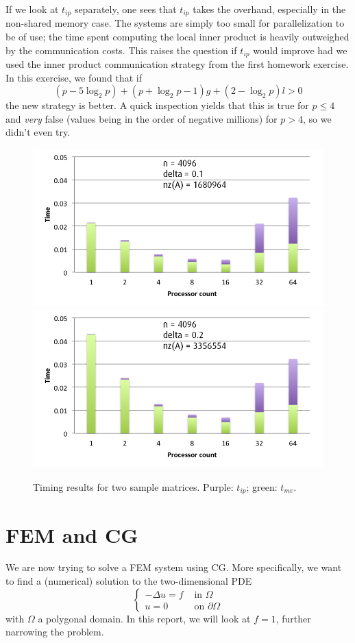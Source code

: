 \documentclass[11pt]{amsart}
\theoremstyle{definition}
\begin{document}
If we look at $t_{ip}$ separately, one sees that $t_{ip}$ takes the overhand, especially in the non-shared memory case. The systems are simply too small for parallelization to be of use; the time spent computing the local inner product is heavily outweighed by the communication costs. This raises the question if $t_{ip}$ would improve had we used the inner product communication strategy from the first homework exercise. \cite{TODOHUISWERK} In this exercise, we found that if
\[
  (p - 5\log_2 p) + (p + \log_2 p - 1)g + (2-\log_2 p)l > 0
\]
the new strategy is better. A quick inspection yields that this is true for $p \leq 4$ and \emph{very} false (values being in the order of negative millions) for $p > 4$, so we didn't even try.

\begin{figure}
  \includegraphics[width=0.48\linewidth]{n4096d0_1mvip.png}
  \includegraphics[width=0.48\linewidth]{n4096d0_2mvip.png}
  \caption{Timing results for two sample matrices. Purple: $t_{ip}$; green: $t_{mv}$.}
  \label{fig:samples}
\end{figure}


\section{FEM and CG}
We are now trying to solve a FEM system using CG. More specifically, we want to find a (numerical) solution to the two-dimensional PDE
\begin{equation}
  \label{eqn:fem}
  \begin{cases} -\Delta u = f & \text{ in } \Omega \\ u = 0 & \text{ on } \partial \Omega \end{cases}
\end{equation}
with $\Omega$ a polygonal domain. In this report, we will look at $f=1$, further narrowing the problem.
\end{document}
